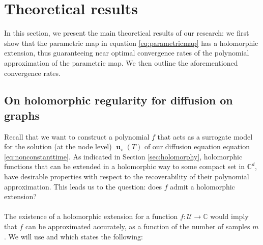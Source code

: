 \documentclass[12pt, oneside]{report}   	%
\newcommand{\C}{\mathbb{C}}
\DeclareMathOperator{\uu}{\boldsymbol{u}}
\begin{document}
\section{Theoretical results}
\label{sec:theory}

In this section, we present the main theoretical results of our research: we first show that the parametric map in equation \eqref{eq:parametricmap} has a holomorphic extension, thus guaranteeing near optimal convergence rates of the polynomial approximation of the parametric map. We then outline the aforementioned convergence rates.

\subsection{On holomorphic regularity for diffusion on graphs}
\label{subsec:maintheory}

Recall that we want to construct a polynomial $f$ that acts as a surrogate model for the solution (at the node level) $\uu_v(T)$ of our diffusion equation equation \eqref{eq:nonconstanttime}. As indicated in Section \ref{sec:holomorphy}, holomorphic functions that can be extended in a holomorphic way to some compact set in $\C^d$, have desirable properties with respect to the recoverability of their polynomial approximation. This leads us to the question: does $f$ admit a holomorphic extension?\\\\
The existence of a holomorphic extension for a function $f:\mathcal{U}\to\C$ would imply that $f$ can be approximated accurately, as a function of the number of samples $m$. We will use \cite{walter} and \cite[Lemma~4.3]{sparsepoly} which states the following:
\end{document}
